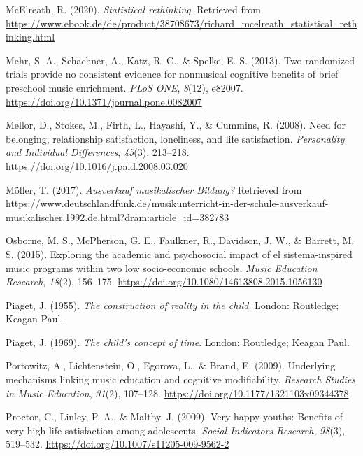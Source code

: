\documentclass[a4, 12pt]{article}
\begin{document}
\leavevmode\hypertarget{ref-Mcelreath2020}{}%
McElreath, R. (2020). \emph{Statistical rethinking}. Retrieved from \url{https://www.ebook.de/de/product/38708673/richard_mcelreath_statistical_rethinking.html}

\leavevmode\hypertarget{ref-Mehr2013}{}%
Mehr, S. A., Schachner, A., Katz, R. C., \& Spelke, E. S. (2013). Two randomized trials provide no consistent evidence for nonmusical cognitive benefits of brief preschool music enrichment. \emph{PLoS ONE}, \emph{8}(12), e82007. \url{https://doi.org/10.1371/journal.pone.0082007}

\leavevmode\hypertarget{ref-Mellor2008}{}%
Mellor, D., Stokes, M., Firth, L., Hayashi, Y., \& Cummins, R. (2008). Need for belonging, relationship satisfaction, loneliness, and life satisfaction. \emph{Personality and Individual Differences}, \emph{45}(3), 213--218. \url{https://doi.org/10.1016/j.paid.2008.03.020}

\leavevmode\hypertarget{ref-Moeller2017}{}%
Möller, T. (2017). \emph{Ausverkauf musikalischer Bildung?} Retrieved from \url{https://www.deutschlandfunk.de/musikunterricht-in-der-schule-ausverkauf-musikalischer.1992.de.html?dram:article_id=382783}

\leavevmode\hypertarget{ref-Osborne2015}{}%
Osborne, M. S., McPherson, G. E., Faulkner, R., Davidson, J. W., \& Barrett, M. S. (2015). Exploring the academic and psychosocial impact of el sistema-inspired music programs within two low socio-economic schools. \emph{Music Education Research}, \emph{18}(2), 156--175. \url{https://doi.org/10.1080/14613808.2015.1056130}

\leavevmode\hypertarget{ref-Piaget1955}{}%
Piaget, J. (1955). \emph{The construction of reality in the child}. London: Routledge; Keagan Paul.

\leavevmode\hypertarget{ref-Piaget1969}{}%
Piaget, J. (1969). \emph{The child's concept of time}. London: Routledge; Keagan Paul.

\leavevmode\hypertarget{ref-Portowitz2009}{}%
Portowitz, A., Lichtenstein, O., Egorova, L., \& Brand, E. (2009). Underlying mechanisms linking music education and cognitive modifiability. \emph{Research Studies in Music Education}, \emph{31}(2), 107--128. \url{https://doi.org/10.1177/1321103x09344378}

\leavevmode\hypertarget{ref-Proctor2009a}{}%
Proctor, C., Linley, P. A., \& Maltby, J. (2009). Very happy youths: Benefits of very high life satisfaction among adolescents. \emph{Social Indicators Research}, \emph{98}(3), 519--532. \url{https://doi.org/10.1007/s11205-009-9562-2}
\end{document}
